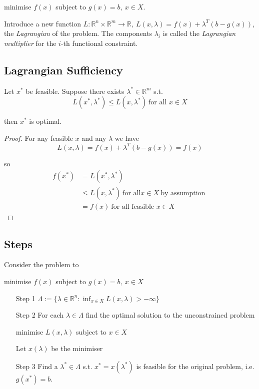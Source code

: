 \documentclass[a4paper]{article}
\begin{document}
\begin{center}
  minimise $f(x)$ subject to $g(x) = b,\: x \in X$.
\end{center}

Introduce a new function $L : \mathbb{R}^n × \mathbb{R}^m → \mathbb{R},\: L(x, \lambda) = f(x) + \lambda^T (b - g(x))$, the \emph{Lagrangian} of the problem. The components $\lambda_i$ is called the \emph{Lagrangian multiplier} for the $i$-th functional constraint.

\subsection{Lagrangian Sufficiency}

\begin{thm}
  Let $x^*$ be feasible. Suppose there exists $\lambda^* \in \mathbb{R}^m$ s.t.
  \[
    L(x^*, \lambda^*) ≤ L(x, \lambda^*) \: \text{for all } x \in X
  \]

  then $x^*$ is optimal.

\end{thm}

\begin{proof}
  For any feasible $x$ and any $\lambda$ we have
  \[
    L(x, \lambda) = f(x) + \lambda^T (b - g(x)) = f(x)
  \]

  so
  \begin{align*}
    f(x^*) &= L(x^*, \lambda^*) \\
           &≤ L(x, \lambda^*) \: \text{for all} x \in X \: \text{by assumption } \\
           &= f(x) \: \text{for all feasible } x \in X
  \end{align*}
\end{proof}

\subsection{Steps}

Consider the problem to

\begin{center}
  minimise $f(x)$ subject to $g(x) = b,\: x \in X$
\end{center}

\begin{itemize}
\item[Step 1] $\Lambda := \{\displaystyle \lambda \in \mathbb{R}^n: \inf_{x \in X} L(x, \lambda) > -∞\}$
\item[Step 2] For each $\lambda \in \Lambda$ find the optimal solution to the unconstrained problem

\begin{center}
  minimise $L(x, \lambda)$ subject to $x \in X$
\end{center}

Let $x(\lambda)$ be the minimiser
\item[Step 3] Find a $\lambda^* \in \Lambda$ s.t. $x^* = x(\lambda^*)$ is feasible for the original problem, i.e. $g(x^*) = b$.
\end{itemize}
\end{document}

